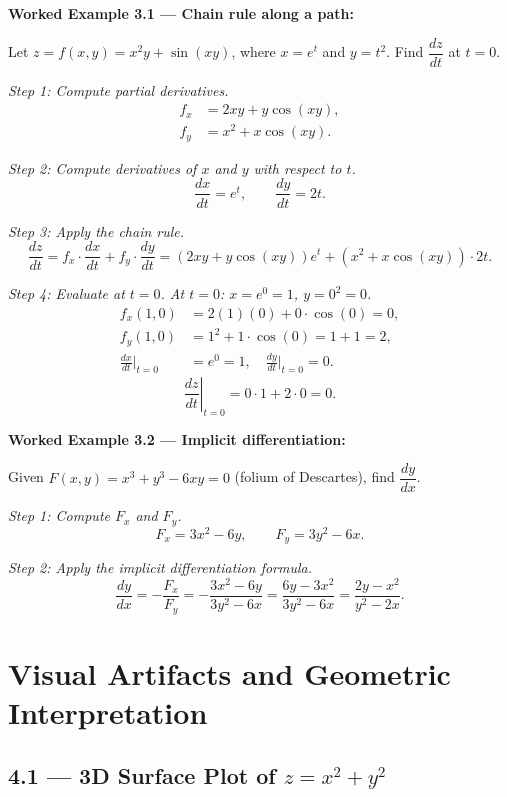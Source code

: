 \documentclass[12pt,a4paper]{article}
\begin{document}
\textbf{Worked Example 3.1 --- Chain rule along a path:}

Let \(z = f(x,y) = x^2 y + \sin(xy)\), where \(x = e^t\) and \(y = t^2\). Find \(\dfrac{dz}{dt}\) at \(t = 0\).

\textit{Step 1: Compute partial derivatives.}
\begin{align*}
f_x &= 2xy + y\cos(xy), \\
f_y &= x^2 + x\cos(xy).
\end{align*}

\textit{Step 2: Compute derivatives of \(x\) and \(y\) with respect to \(t\).}
\[
\frac{dx}{dt} = e^t, \qquad \frac{dy}{dt} = 2t.
\]

\textit{Step 3: Apply the chain rule.}
\[
\frac{dz}{dt} = f_x \cdot \frac{dx}{dt} + f_y \cdot \frac{dy}{dt}
= (2xy + y\cos(xy)) e^t + (x^2 + x\cos(xy)) \cdot 2t.
\]

\textit{Step 4: Evaluate at \(t = 0\). At \(t=0\): \(x = e^0 = 1\), \(y = 0^2 = 0\).}
\begin{align*}
f_x(1,0) &= 2(1)(0) + 0\cdot\cos(0) = 0, \\
f_y(1,0) &= 1^2 + 1\cdot\cos(0) = 1 + 1 = 2, \\
\frac{dx}{dt}\big|_{t=0} &= e^0 = 1, \quad \frac{dy}{dt}\big|_{t=0} = 0.
\end{align*}
\[
\left.\frac{dz}{dt}\right|_{t=0} = 0 \cdot 1 + 2 \cdot 0 = 0.
\]

\textbf{Worked Example 3.2 --- Implicit differentiation:}

Given \(F(x,y) = x^3 + y^3 - 6xy = 0\) (folium of Descartes), find \(\dfrac{dy}{dx}\).

\textit{Step 1: Compute \(F_x\) and \(F_y\).}
\[
F_x = 3x^2 - 6y, \qquad F_y = 3y^2 - 6x.
\]

\textit{Step 2: Apply the implicit differentiation formula.}
\[
\frac{dy}{dx} = -\frac{F_x}{F_y} = -\frac{3x^2 - 6y}{3y^2 - 6x} = \frac{6y - 3x^2}{3y^2 - 6x} = \frac{2y - x^2}{y^2 - 2x}.
\]

\section{Visual Artifacts and Geometric Interpretation}

\subsection*{4.1 --- 3D Surface Plot of \(z = x^2 + y^2\)}
\end{document}
